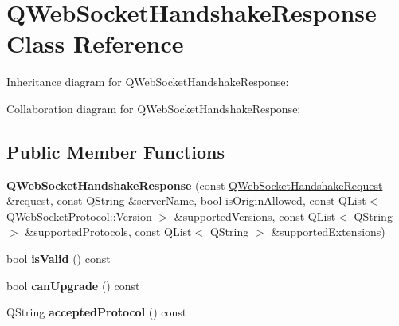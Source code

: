 \hypertarget{class_q_web_socket_handshake_response}{}\section{Q\+Web\+Socket\+Handshake\+Response Class Reference}
\label{class_q_web_socket_handshake_response}


Inheritance diagram for Q\+Web\+Socket\+Handshake\+Response\+:


Collaboration diagram for Q\+Web\+Socket\+Handshake\+Response\+:
\subsection*{Public Member Functions}
\begin{DoxyCompactItemize}
\item 
\mbox{\label{class_q_web_socket_handshake_response_a5820f9482f4dfe301e282aee38b6f3ce}} 
{\bfseries Q\+Web\+Socket\+Handshake\+Response} (const \mbox{\hyperlink{class_q_web_socket_handshake_request}{Q\+Web\+Socket\+Handshake\+Request}} \&request, const Q\+String \&server\+Name, bool is\+Origin\+Allowed, const Q\+List$<$ \mbox{\hyperlink{namespace_q_web_socket_protocol_ad53f2684577effe0a517eadb48714df3}{Q\+Web\+Socket\+Protocol\+::\+Version}} $>$ \&supported\+Versions, const Q\+List$<$ Q\+String $>$ \&supported\+Protocols, const Q\+List$<$ Q\+String $>$ \&supported\+Extensions)
\item 
\mbox{\label{class_q_web_socket_handshake_response_a148db5271e62b7b6d2d589d18fa31b48}} 
bool {\bfseries is\+Valid} () const
\item 
\mbox{\label{class_q_web_socket_handshake_response_a820a7ee754d12ecc83423ca4192587ff}} 
bool {\bfseries can\+Upgrade} () const
\item 
\mbox{\label{class_q_web_socket_handshake_response_afb4f7d451b4d0f7ca020fc9f9f727fe8}} 
Q\+String {\bfseries accepted\+Protocol} () const
\item 
\mbox{\label{class_q_web_socket_handshake_response_ad149676ba9c5fe115a2a00b273ff414c}} 

\end{DoxyCompactItemize}
